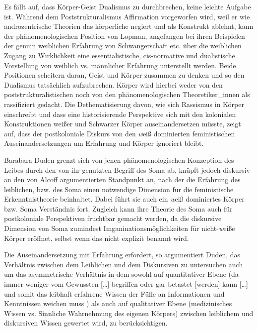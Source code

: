 Es fällt auf, dass Körper-Geist Dualismus zu durchbrechen, keine leichte
Aufgabe ist. Während dem Poststrukturalismus Affirmation vorgeworfen wird, weil
er wie androzentrische Theorien das körperliche negiert und als Konstrukt
ablehnt, kann der phänomenologischen Position von Lopman, angefangen bei ihren
Beispielen der genuin weiblichen Erfahrung von Schwangerschaft etc. über die
weiblichen Zugang zu Wirklichkeit eine essentialistische, cis-normative und
dualistische Vorstellung von weiblich vs. männlicher Erfahrung unterstellt
werden. Beide Positionen scheitern daran, Geist und Körper zusammen zu denken
und so den Dualismus tatsächlich aufzubrechen. Körper wird hierbei weder von
den poststrukturalistischen noch von den phänomenologischen Theoretiker\_innen
als rassifiziert gedacht. Die Dethematisierung davon, wie sich Rassismus in
Körper einschreibt und dass eine historisierende Perspektive sich mit den
kolonialen Konstruktionen weißer und Schwarzer Körper auseinandersetzen müsste,
zeigt auf, dass der postkoloniale Diskurs von den \textit{w}eiß dominierten
feministischen Auseinandersetzungen um Erfahrung und Körper ignoriert bleibt. 

Barabara Duden grenzt sich von jenen phänomenologischen Konzeption des Leibes
durch den von ihr genutzten Begriff des Soma ab, knüpft jedoch diskursiv an den
von Alcoff argumentierten Standpunkt an, nach der die Erfahrung des leiblichen,
bzw. des Soma einen notwendige Dimension für die feministische
Erkenntnistheorie beinhaltet. Dabei führt sie auch ein \textit{w}eiß dominiertes Körper
bzw. Soma Verständnis fort. Zugleich kann ihre Theorie des Soma auch für
postkoloniale Perspektiven fruchtbar gemacht werden, da die diskursive
Dimension von Soma zumindest Imganinationsmöglichkeiten für nicht-\textit{w}eiße Körper
eröffnet, selbst wenn das nicht explizit benannt wird.

Die Auseinandersetzung mit Erfahrung erfordert, so argumentiert Duden, das
Verhältnis zwischen dem Leiblichen und dem Diskursiven zu untersuchen auch um
das asymmetrische Verhältnis in dem sowohl auf quantitativer Ebene (\glqq da immer
weniger vom Gewussten […] begriffen oder gar betastet [werden] kann […] und
somit das leibhaft erfahrene Wissen der Fülle an Informationen und Kenntnissen
weichen muss \grqq) \footnotemark {} als auch auf qualitativer Ebene (medizinisches Wissen vs.
Sinnliche Wahrnehmung des eigenen Körpers) zwischen leiblichem und diskursiven
Wissen gewertet wird, zu berücksichtigen.


